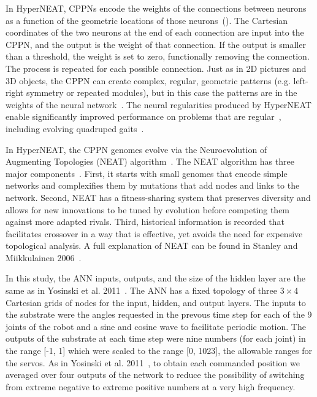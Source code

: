 In HyperNEAT, CPPNs encode the weights of the connections between neurons as a function of the geometric locations of those neurons~(). The Cartesian coordinates of the two neurons at the end of each connection are input into the CPPN, and the output is the weight of that connection. If the output is smaller than a threshold, the weight is set to zero, functionally removing the connection. The process is repeated for each possible connection. Just as in 2D pictures and 3D objects, the CPPN can create complex, regular, geometric patterns (e.g. left-right symmetry or repeated modules), but in this case the patterns are in the weights of the neural network~\cite{clune2011performance}. The neural regularities produced by HyperNEAT enable significantly improved performance on problems that are regular~\cite{clune2011performance,stanley2009hypercube}, including evolving quadruped gaits~\cite{clune2011performance,clune2009evolving,clune2009sensitivity}. 

In HyperNEAT, the CPPN genomes evolve via the Neuroevolution of Augmenting Topologies (NEAT) algorithm~\cite{stanley2006exploiting}. 
The NEAT algorithm has three major components~\cite{stanley2006exploiting}. 
First, it starts with small genomes that encode simple networks and complexifies them by mutations that add nodes and links to the network. Second, NEAT has a fitness-sharing system that preserves diversity and allows for new innovations to be tuned by evolution before competing them against more adapted rivals. 
Third, historical information is recorded that facilitates crossover in a way that is effective, yet avoids the need for expensive topological analysis. A full explanation of NEAT can be found in Stanley and Miikkulainen 2006~\cite{stanley2006exploiting}. 

In this study, the ANN inputs, outputs, and the size of the hidden layer are the same as in Yosinski et al. 2011~\cite{yos:clune}. 
The ANN has a fixed topology of three \begin{math}3\times4\end{math} Cartesian grids of nodes for the input, hidden, and output layers. 
The inputs to the substrate were the angles requested in the prevous time step for each of the 9 joints of the robot and a sine and cosine wave to facilitate periodic motion. 
The outputs of the substrate at each time step were nine numbers (for each joint) in the range [-1, 1] which were scaled to the range [0, 1023], the allowable ranges for the servos. 
As in Yosinski et al. 2011~\cite{yos:clune}, to obtain each commanded position we averaged over four outputs of the network to reduce the possibility of switching from extreme negative to extreme positive numbers at a very high frequency. 

